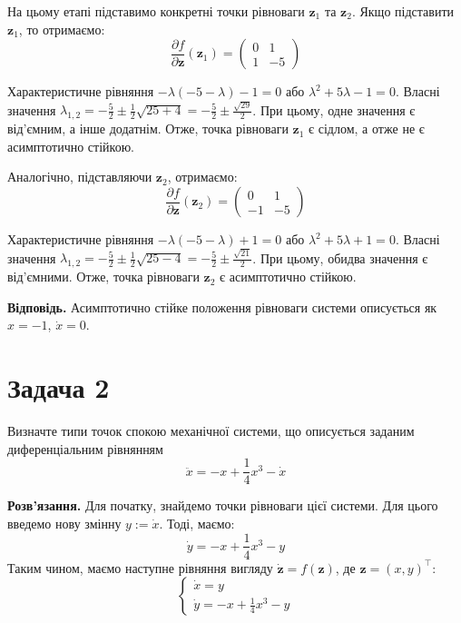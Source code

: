 \documentclass{hw_template}
\begin{document}
На цьому етапі підставимо конкретні точки рівноваги $\mathbf{z}_1$ та
$\mathbf{z}_2$. Якщо підставити $\mathbf{z}_1$, то отримаємо:
\begin{equation*}
    \frac{\partial f}{\partial \mathbf{z}}(\mathbf{z}_1) = 
    \begin{pmatrix}
        0 & 1 \\
        1 & -5
    \end{pmatrix}
\end{equation*}

Характеристичне рівняння $-\lambda(-5-\lambda) - 1 = 0$ або $\lambda^2 +
5\lambda - 1 = 0$. Власні значення $\lambda_{1,2} = -\frac{5}{2} \pm
\frac{1}{2}\sqrt{25+4} = -\frac{5}{2} \pm \frac{\sqrt{29}}{2}$. При 
цьому, одне значення є від'ємним, а інше додатнім. Отже, точка
рівноваги $\mathbf{z}_1$ є сідлом, а отже не є асимптотично стійкою.

Аналогічно, підставляючи $\mathbf{z}_2$, отримаємо:
\begin{equation*}
    \frac{\partial f}{\partial \mathbf{z}}(\mathbf{z}_2) = 
    \begin{pmatrix}
        0 & 1 \\
        -1 & -5
    \end{pmatrix}
\end{equation*}

Характеристичне рівняння $-\lambda(-5-\lambda) + 1 = 0$ або $\lambda^2 +
5\lambda + 1 = 0$. Власні значення $\lambda_{1,2} = -\frac{5}{2} \pm
\frac{1}{2}\sqrt{25-4} = -\frac{5}{2} \pm \frac{\sqrt{21}}{2}$. При цьому,
обидва значення є від'ємними. Отже, точка рівноваги $\mathbf{z}_2$ є
асимптотично стійкою.

\textbf{Відповідь.} Асимптотично стійке положення рівноваги системи описується як $x = -1$, $\dot{x} = 0$.

\newpage 

\section{Задача 2}

\begin{problem}
    Визначте типи точок спокою механічної системи, що описується заданим
    диференціальним рівнянням
    \begin{equation*}
        \ddot{x} = -x + \frac{1}{4}x^3 - \dot{x}
    \end{equation*}
\end{problem}

\textbf{Розв'язання.} Для початку, знайдемо точки рівноваги цієї системи. Для
цього введемо нову змінну $y := \dot{x}$. Тоді, маємо:
\begin{equation*}
    \dot{y} = -x + \frac{1}{4}x^3 - y
\end{equation*}
Таким чином, маємо наступне рівняння вигляду $\dot{\mathbf{z}} = f(\mathbf{z})$,
де $\mathbf{z} = (x,y)^{\top}$:
\begin{equation*}
    \begin{cases}
        \dot{x} = y \\
        \dot{y} = -x + \frac{1}{4}x^3 - y
    \end{cases}
\end{equation*}
\end{document}
